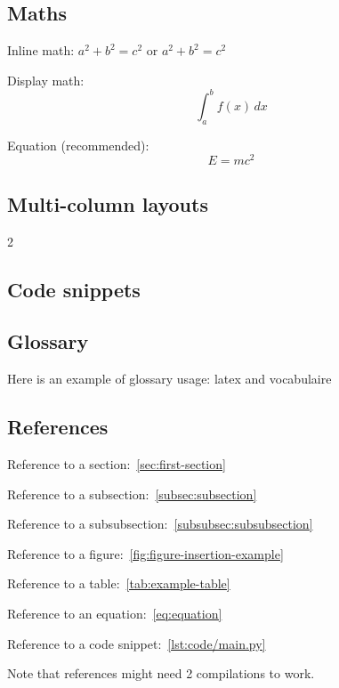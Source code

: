 \subsection{Maths}\label{subsec:maths}
Inline math: \( a^2 + b^2 = c^2 \) or $ a^2 + b^2 = c^2 $

Display math:
\[
    \int_{a}^{b} f(x) \, dx
\]

Equation (recommended):
\begin{equation}
    E = mc^2\label{eq:equation}
\end{equation}

\subsection{Multi-column layouts}\label{subsec:multi-column-layouts}
\begin{multicols}{2}
    \lipsum[1]
\end{multicols}

\subsection{Code snippets}\label{subsec:code-snippets}


\subsection{Glossary}\label{subsec:glossary}
Here is an example of glossary usage: \Gls{latex} and \gls{vocabulaire}

\subsection{References}\label{subsec:references}
Reference to a section:~\ref{sec:first-section}

Reference to a subsection:~\ref{subsec:subsection}

Reference to a subsubsection:~\ref{subsubsec:subsubsection}

Reference to a figure:~\ref{fig:figure-insertion-example}

Reference to a table:~\ref{tab:example-table}

Reference to an equation:~\eqref{eq:equation}

Reference to a code snippet:~\ref{lst:code/main.py}

Note that references might need 2 compilations to work.
